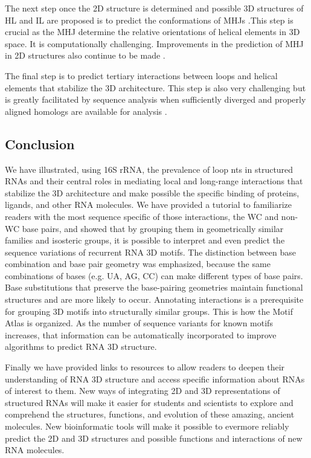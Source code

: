 The next step once the 2D structure is determined and possible 3D structures of
HL and IL are proposed is to predict the conformations of MHJs
\cite{Lamiable2012, Laing2011}.This step is crucial as the MHJ determine the
relative orientations of helical elements in 3D space. It is computationally
challenging. Improvements in the prediction of MHJ in 2D structures also
continue to be made \cite{Liu2011b}.

The final step is to predict tertiary interactions between loops and helical
elements that stabilize the 3D architecture. This step is also very challenging
but is greatly facilitated by sequence analysis when sufficiently diverged and
properly aligned homologs are available for analysis \cite{Michel2000,
Westhof2011}.

\subsection{Conclusion}

We have illustrated, using 16S rRNA, the prevalence of loop nts in structured
RNAs and their central roles in mediating local and long-range interactions that
stabilize the 3D architecture and make possible the specific binding of
proteins, ligands, and other RNA molecules. We have provided a tutorial to
familiarize readers with the most sequence specific of those interactions, the
WC and non-WC base pairs, and showed that by grouping them in geometrically
similar families and isosteric groups, it is possible to interpret and even
predict the sequence variations of recurrent RNA 3D motifs. The distinction
between base combination and base pair geometry was emphasized, because the same
combinations of bases (e.g. UA, AG, CC) can make different types of base pairs.
Base substitutions that preserve the base-pairing geometries maintain functional
structures and are more likely to occur. Annotating interactions is a
prerequisite for grouping 3D motifs into structurally similar groups. This is
how the Motif Atlas is organized. As the number of sequence variants for known
motifs increases, that information can be automatically incorporated to improve
algorithms to predict RNA 3D structure. 

Finally we have provided links to resources to allow readers to deepen their
understanding of RNA 3D structure and access specific information about RNAs of
interest to them. New ways of integrating 2D and 3D representations of
structured RNAs will make it easier for students and scientists to explore and
comprehend the structures, functions, and evolution of these amazing, ancient
molecules. New bioinformatic tools will make it possible to evermore reliably
predict the 2D and 3D structures and possible functions and interactions of new
RNA molecules.
